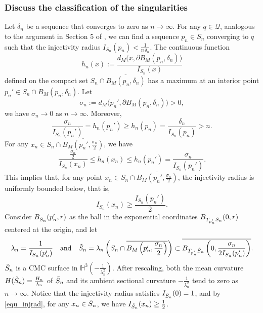 \documentclass[12pt,a4paper]{amsart}
\numberwithin{equation}{section}
\theoremstyle{plain}
\theoremstyle{named}
\theoremstyle{definition}
\begin{document}
    \subsubsection{Discuss the classification of the singularities}
     Let $\delta_n$ be a sequence that converges to zero as $n\rightarrow \infty$.
     For any $q\in \mathcal{Q}$, analogous to the argument in Section 5 of \cite{Meeks-Tinaglia}, we can find a sequence $p_n\in S_n$ converging to $q$ such that the injectivity radius $I_{S_n}(p_n)<\frac{1}{n\,\delta_n}$. The continuous function \begin{equation*}
         h_n(x):=\frac{d_M\big(x,\partial B_M(p_n,\delta_n)\big)}{I_{S_n}(x)}
     \end{equation*}
     defined on the compact set $S_n\cap\overline{B_M(p_n,\delta_n)}$ has a maximum at an interior point $p_n'\in S_n\cap B_M(p_n,\delta_n)$. Let \begin{equation}\label{equ_sigma_n}
         \sigma_n:=d_M\big(p_n',\partial B_M(p_n,\delta_n)\big)>0,
     \end{equation}
     we have $\sigma_n\rightarrow 0$ as $n\rightarrow\infty$. 
     Moreover,
     \begin{equation}\label{equ_factor}
         \frac{\sigma_n}{I_{S_n}(p_n')}=h_n(p_n')\geq h_n(p_n)=\frac{\delta_n}{I_{S_n}(p_n)}>n.
     \end{equation}
     For any $x_n\in S_n\cap\overline{B_M(p_n',\frac{\sigma_n}{2})}$, we have \begin{equation*}
         \frac{\frac{\sigma_n}{2}}{I_{S_n}(x_n)}\leq h_n(x_n)\leq h_n(p_n')=\frac{\sigma_n}{I_{S_n}(p_n')}.
     \end{equation*}
     This implies that, for any point $x_n\in S_n\cap\overline{B_M(p_n',\frac{\sigma_n}{2})}$, the injectivity radius is uniformly bounded below, that is, 
     \begin{equation}\label{equ_injrad}
         I_{S_n}(x_n)\geq \frac{I_{S_n}(p_n')}{2}.
     \end{equation}
    Consider $B_{\Tilde{S}_n}(p_n',r)$ as the ball in the exponential coordinates $B_{T_{p_n'}\Tilde{S}_n}(0,r)$ centered at the origin, and let \begin{equation*}
        \lambda_n=\frac{1}{I_{S_n}(p_n')}\quad \text{and}\quad \Tilde{S}_n=\lambda_n\left(S_n\cap\overline{B_M\left(p_n',\frac{\sigma_n}{2}\right)}\right)\subset \overline{B_{T_{p_n'}\Tilde{S}_n}\left(0,\frac{\sigma_n}{2I_{S_n}(p_n')}\right)}.
    \end{equation*}
    $\Tilde{S}_n$ is a CMC surface in $\mathbb{H}^3\left(-\frac{1}{\lambda_n^2}\right)$.
     After rescaling, both the mean curvature $H(\Tilde{S}_n)=\frac{H_n}{\lambda_n}$ of $\Tilde{S}_n$ and its ambient sectional curvature $-\frac{1}{\lambda_n^2}$ tend to zero as $n\to \infty$.
    Notice that the injectivity radius satisfies $I_{\Tilde{S}_n}(0)=1$, and by \eqref{equ_injrad}, for any $x_n\in \Tilde{S}_n$, we have $I_{\Tilde{S}_n}(x_n)\geq \frac{1}{2}$.
    
\end{document}
